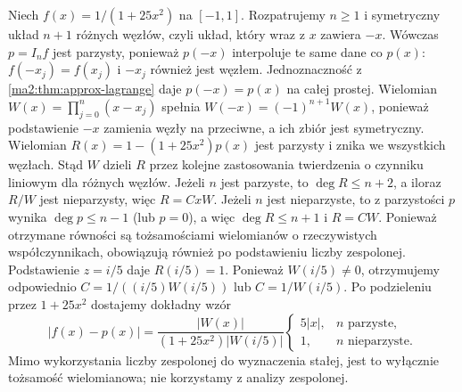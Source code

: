 \begin{przyklad}
\label{ma2:ex:approx-runge-exact}
Niech $f(x)=1/(1+25x^2)$ na $[-1,1]$.
Rozpatrujemy $n\ge1$ i symetryczny
układ $n+1$ różnych węzłów, czyli układ,
który wraz z $x$ zawiera $-x$.
Wówczas $p=I_nf$ jest parzysty, ponieważ
$p(-x)$ interpoluje te same dane co $p(x)$:
$f(-x_j)=f(x_j)$ i $-x_j$ również jest węzłem.
Jednoznaczność z \ref{ma2:thm:approx-lagrange}
daje $p(-x)=p(x)$ na całej prostej.
Wielomian $W(x)=\prod_{j=0}^n(x-x_j)$
spełnia $W(-x)=(-1)^{n+1}W(x)$,
ponieważ podstawienie $-x$ zamienia węzły
na przeciwne, a ich zbiór jest symetryczny.
Wielomian $R(x)=1-(1+25x^2)p(x)$ jest parzysty
i znika we wszystkich węzłach.
Stąd $W$ dzieli $R$ przez kolejne zastosowania
twierdzenia o czynniku liniowym dla różnych węzłów.
Jeżeli $n$ jest parzyste, to $\deg R\le n+2$,
a iloraz $R/W$ jest nieparzysty, więc $R=CxW$.
Jeżeli $n$ jest nieparzyste, to z parzystości $p$
wynika $\deg p\le n-1$ (lub $p=0$), a więc
$\deg R\le n+1$ i $R=CW$.
Ponieważ otrzymane równości są tożsamościami
wielomianów o rzeczywistych współczynnikach,
obowiązują również po podstawieniu liczby zespolonej.
Podstawienie $z=i/5$ daje
$R(i/5)=1$. Ponieważ $W(i/5)\ne0$,
otrzymujemy odpowiednio
$C=1/((i/5)W(i/5))$ lub $C=1/W(i/5)$.
Po podzieleniu przez $1+25x^2$ dostajemy
dokładny wzór
\[
 |f(x)-p(x)|=
 \frac{|W(x)|}{(1+25x^2)|W(i/5)|}
 \begin{cases}
 5|x|,&n\text{ parzyste},\\
 1,&n\text{ nieparzyste}.
 \end{cases}
\]
Mimo wykorzystania liczby zespolonej do
wyznaczenia stałej, jest to wyłącznie
tożsamość wielomianowa; nie korzystamy
z analizy zespolonej.
\end{przyklad}

